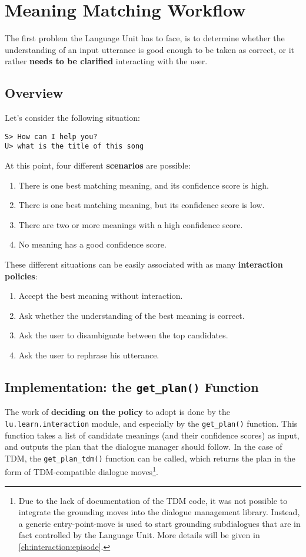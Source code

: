 \section{Meaning Matching Workflow} \label{ch:interaction:mmw}
The first problem the Language Unit has to face, is to determine whether the understanding of an input utterance is good enough to be taken as correct, or it rather \textbf{needs to be clarified} interacting with the user.

\subsection{Overview}
Let's consider the following situation:

\texttt{S> How can I help you? \\
U> what is the title of this song}

At this point, four different \textbf{scenarios} are possible:
\begin{enumerate}
	\item There is one best matching meaning, and its confidence score is high.
	\item There is one best matching meaning, but its confidence score is low.
	\item There are two or more meanings with a high confidence score.
	\item No meaning has a good confidence score.
\end{enumerate}
These different situations can be easily associated with as many \textbf{interaction policies}:
\begin{enumerate}
	\item Accept the best meaning without interaction.
	\item Ask whether the understanding of the best meaning is correct.
	\item Ask the user to disambiguate between the top candidates.
	\item Ask the user to rephrase his utterance.
\end{enumerate}

\subsection{Implementation: the \texttt{get\_plan()} Function} \label{ch:interaction:mmw:getplan}
The work of \textbf{deciding on the policy} to adopt is done by the \texttt{lu.learn.interaction} module, and especially by the \texttt{get\_plan()} function. This function takes a list of candidate meanings (and their confidence scores) as input, and outputs the plan that the dialogue manager should follow. In the case of TDM, the \texttt{get\_plan\_tdm()} function can be called, which returns the plan in the form of TDM-compatible dialogue moves\footnote{Due to the lack of documentation of the TDM code, it was not possible to integrate the grounding moves into the dialogue management library. Instead, a generic entry-point-move is used to start grounding subdialogues that are in fact controlled by the Language Unit. More details will be given in \ref{ch:interaction:episode}.}.

